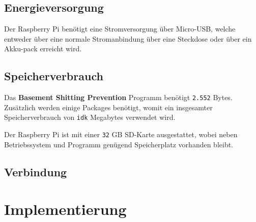 \subsection{Energieversorgung}

Der Raspberry Pi benötigt eine Stromversorgung über Micro-USB, welche entweder über eine normale Stromanbindung über eine Steckdose oder über ein Akku-pack erreicht wird.
\subsection{Speicherverbrauch}

Das \textbf{Basement Shitting Prevention} Programm benötigt \texttt{2.552} Bytes. Zusätzlich werden einige Packages benötigt, womit ein insgesamter Speicherverbrauch von \texttt{idk} Megabytes verwendet wird.

Der Raspberry Pi ist mit einer \texttt{32} GB SD-Karte ausgestattet, wobei neben Betriebssystem und Programm genügend Speicherplatz vorhanden bleibt.

\subsection{Verbindung}




\clearpage
\section{Implementierung}
